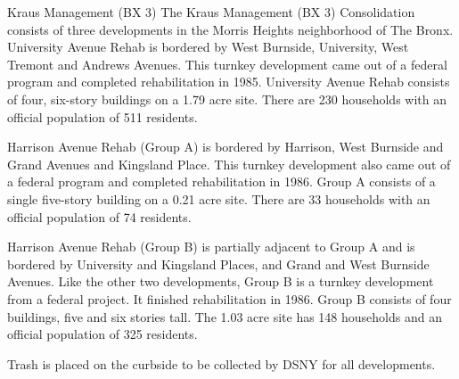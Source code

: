 Kraus Management (BX 3)
The Kraus Management (BX 3) Consolidation consists of three developments in the Morris Heights neighborhood of The Bronx. University Avenue Rehab is bordered by West Burnside, University, West Tremont and Andrews Avenues. This turnkey development came out of a federal program and completed rehabilitation in 1985. University Avenue Rehab consists of four, six-story buildings on a 1.79 acre site. There are 230 households with an official population of 511 residents. 

Harrison Avenue Rehab (Group A) is bordered by Harrison, West Burnside and Grand Avenues and Kingsland Place. This turnkey development also came out of a federal program and completed rehabilitation in 1986. Group A consists of a single five-story building on a 0.21 acre site. There are 33 households with an official population of 74 residents.

Harrison Avenue Rehab (Group B) is partially adjacent to Group A and is bordered by University and Kingsland Places, and Grand and West Burnside Avenues. Like the other two developments, Group B is a turnkey development from a federal project. It finished rehabilitation in 1986. Group B consists of four buildings, five and six stories tall. The 1.03  acre site has 148 households and an official population of 325 residents.

Trash is placed on the curbside to be collected by DSNY for all developments.